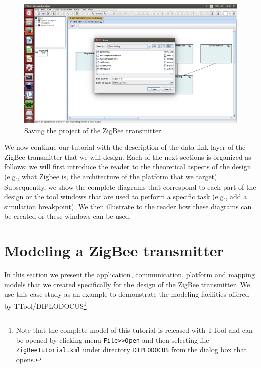 \documentclass{llncs}
\newcommand{\screenshotsize}{1.0\textwidth}
\begin{document}
%
\begin{figure}[htbp]
	\centering
	\includegraphics[width=\screenshotsize]{./figures/screenshot/SaveName.png}
	\caption{Saving the project of the ZigBee transmitter}
	\label{fig:SaveName}
\end{figure}
%
We now continue our tutorial with the description of the data-link layer of the ZigBee transmitter that we will design.
Each of the next sections is organized as follows: we will first introduce the reader to the theoretical aspects of the
design (e.g., what Zigbee is, the architecture of the platform that we target). Subsequently, we show the complete
diagrams that correspond to each part of the design or the tool windows that are used to perform a specific task (e.g.,
add a simulation breakpoint). We then illustrate to the reader how these diagrams can be created or these windows can be
used.
%
%
%
\newpage
\section{Modeling a ZigBee transmitter}
\label{sec:Modeling}
%
In this section we present the application, communication, platform and mapping models that we created specifically for
the design of the ZigBee transmitter. We use this case study as an example to demonstrate the modeling
facilities offered by TTool/DIPLODOCUS\footnote{Note that the complete model of
this tutorial is released with TTool and can be opened by clicking menu
\texttt{File>>Open} and then selecting file \texttt{ZigBeeTutorial.xml} under directory
\texttt{DIPLODOCUS} from the dialog box that opens.}
%
\end{document}
